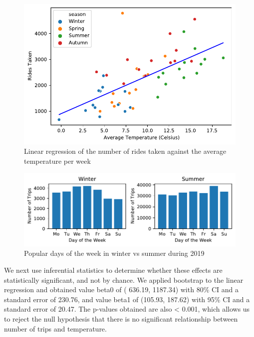 \documentclass[11pt,a4paper]{article}
\begin{document}
\begin{figure}[H]
  \centering
  \includegraphics{report/8.1}
  \caption{Linear regression of the number of rides taken against the average temperature per week}
  \label{linreg:fig:8.1}
\end{figure}


\begin{figure}[H]
  \centering
  \includegraphics{report/5}
  \caption{Popular days of the week in winter vs summer during 2019}
  \label{bar:fig:5}
\end{figure}

We next use inferential statistics to determine whether these effects are statistically significant, and not by chance. We applied bootstrap to the linear regression and obtained value beta0 of ( 636.19, 1187.34) with 80\% CI and a standard error of 230.76, and value beta1 of  (105.93, 187.62) with 95\% CI and a standard error of 20.47. The p-values obtained are also < 0.001, which allows us to reject the null hypothesis that there is no significant relationship between number of trips and temperature.



\end{document}
